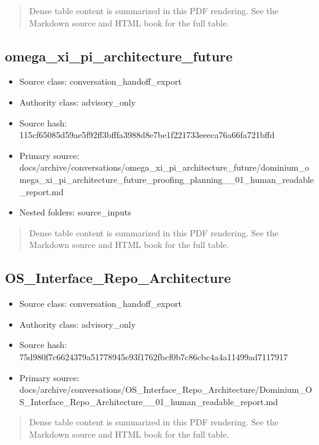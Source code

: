 \documentclass[11pt,a4paper]{report}
\begin{document}
\begin{quote}\small Dense table content is summarized in this PDF rendering. See the Markdown source and HTML book for the full table.\end{quote}

\subsection{omega\_xi\_pi\_architecture\_future}

\begin{itemize}
\item Source class: conversation\_handoff\_export
\item Authority class: advisory\_only
\item Source hash: 115cf65085d59ae5f92ff3bfffa3988d8e7be1f221733eeeca76a66fa721bffd
\item Primary source: docs/archive/conversations/omega\_xi\_pi\_architecture\_future/dominium\_omega\_xi\_pi\_architecture\_future\_proofing\_planning\_\_01\_human\_readable\_report.md
\item Nested folders: source\_inputs
\end{itemize}

\begin{quote}\small Dense table content is summarized in this PDF rendering. See the Markdown source and HTML book for the full table.\end{quote}

\subsection{OS\_Interface\_Repo\_Architecture}

\begin{itemize}
\item Source class: conversation\_handoff\_export
\item Authority class: advisory\_only
\item Source hash: 75d980f7c6624379a51778945e93f1762fbcf0b7c86cbc4a4a11499ad7117917
\item Primary source: docs/archive/conversations/OS\_Interface\_Repo\_Architecture/Dominium\_OS\_Interface\_Repo\_Architecture\_\_01\_human\_readable\_report.md
\end{itemize}

\begin{quote}\small Dense table content is summarized in this PDF rendering. See the Markdown source and HTML book for the full table.\end{quote}
\end{document}
